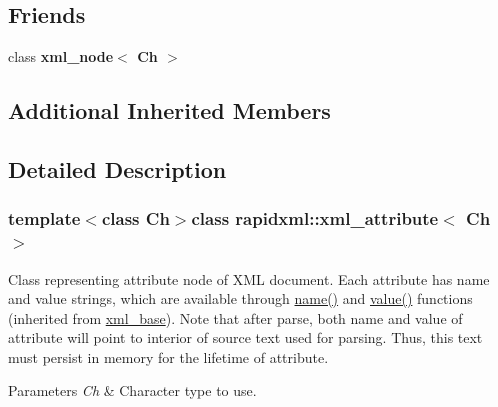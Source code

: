 \subsection*{Friends}
\begin{DoxyCompactItemize}
\item 
\hypertarget{classrapidxml_1_1xml__attribute_aa7e464ce3fe512598ff8dda47291941f}{class {\bfseries xml\-\_\-node$<$ Ch $>$}}\label{classrapidxml_1_1xml__attribute_aa7e464ce3fe512598ff8dda47291941f}

\end{DoxyCompactItemize}
\subsection*{Additional Inherited Members}


\subsection{Detailed Description}
\subsubsection*{template$<$class Ch$>$class rapidxml\-::xml\-\_\-attribute$<$ Ch $>$}

Class representing attribute node of X\-M\-L document. Each attribute has name and value strings, which are available through \hyperlink{classrapidxml_1_1xml__base_a9a09739310469995db078ebd0da3ed45}{name()} and \hyperlink{classrapidxml_1_1xml__base_adcdaccff61c665f039d9344e447b7445}{value()} functions (inherited from \hyperlink{classrapidxml_1_1xml__base}{xml\-\_\-base}). Note that after parse, both name and value of attribute will point to interior of source text used for parsing. Thus, this text must persist in memory for the lifetime of attribute. 
\begin{DoxyParams}{Parameters}
{\em Ch} & Character type to use. \\
\hline
\end{DoxyParams}


